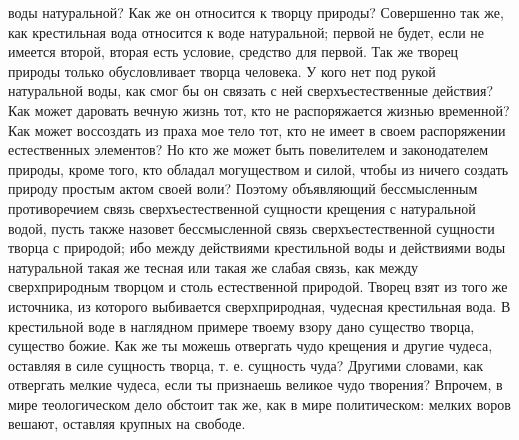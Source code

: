 \documentclass[12pt]{article}
\begin{document}
воды натуральной? Как же он относится к творцу природы? Совершенно так же, как крестильная вода относится к воде натуральной; первой не будет, если не имеется второй, вторая есть условие, средство для первой. Так же творец природы только обусловливает творца человека. У кого нет под рукой натуральной воды, как смог бы он связать с ней сверхъестественные действия? Как может даровать вечную жизнь тот, кто не распоряжается жизнью временной? Как может воссоздать из праха мое тело тот, кто не имеет в своем распоряжении естественных элементов? Но кто же может быть повелителем и законодателем природы, кроме того, кто обладал могуществом и силой, чтобы из ничего создать природу простым актом своей воли? Поэтому объявляющий бессмысленным противоречием связь сверхъестественной сущности крещения с натуральной водой, пусть также назовет бессмысленной связь сверхъестественной сущности творца с природой; ибо между действиями крестильной воды и действиями воды натуральной такая же тесная или такая же слабая связь, как между сверхприродным творцом и столь естественной природой. Творец взят из того же источника, из которого выбивается сверхприродная, чудесная крестильная вода. В крестильной воде в наглядном примере твоему взору дано существо творца, существо божие. Как же ты можешь отвергать чудо крещения и другие чудеса, оставляя в силе сущность творца, т. е. сущность чуда? Другими словами, как отвергать мелкие чудеса, если ты признаешь великое чудо творения? Впрочем, в мире теологическом дело обстоит так же, как в мире политическом: мелких воров вешают, оставляя крупных на свободе.



\section{}
\end{document}
